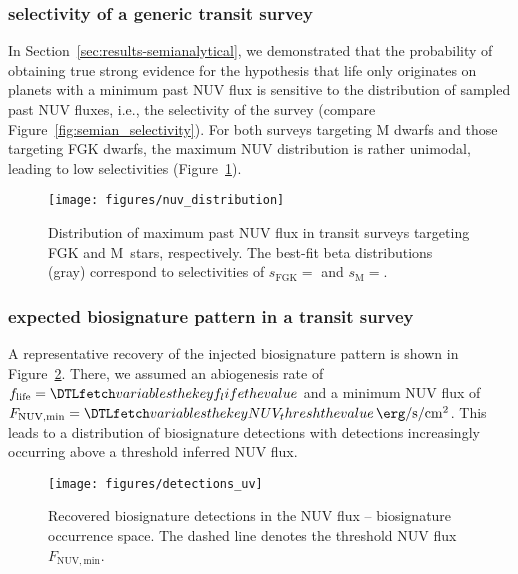 \documentclass[modern,linenumbers]{aastex631}
\begin{document}
\subsubsection{selectivity of a generic transit survey}
In Section~\ref{sec:results-semianalytical}, we demonstrated that the probability of obtaining true strong evidence for the hypothesis that life only originates on planets with a minimum past \gls{NUV} flux is sensitive to the distribution of sampled past \gls{NUV} fluxes, i.e., the selectivity of the survey (compare Figure~\ref{fig:semian_selectivity}).
For both surveys targeting M dwarfs and those targeting FGK dwarfs, the maximum \gls{NUV} distribution is rather unimodal, leading to low selectivities (Figure~\ref{fig:nuv_distribution}).
\begin{figure}
    \begin{centering}
        \texttt{[image: figures/nuv\_distribution]}
        \caption{Distribution of maximum past \gls{NUV} flux in transit surveys targeting FGK and M~stars, respectively. The best-fit beta distributions (gray) correspond to selectivities of $s_\mathrm{FGK} = $ and $s_\mathrm{M} = $.}
        \label{fig:nuv_distribution}
    \end{centering}
\end{figure}


\subsubsection{expected biosignature pattern in a transit survey}
A representative recovery of the injected biosignature pattern is shown in Figure~\ref{fig:detections_uv}.
There, we assumed an abiogenesis rate of $f_\mathrm{life} = \var{f_life}$ and a minimum \gls{NUV} flux of $F_\mathrm{NUV, min} = \var{NUV_thresh}\,\SI{}{\erg\per\second\per\centi\meter\squared}$.
This leads to a distribution of biosignature detections with detections increasingly occurring above a threshold inferred NUV flux.
\begin{figure}
    \begin{centering}
        \texttt{[image: figures/detections\_uv]}
        \caption{Recovered biosignature detections in the \gls{NUV} flux -- biosignature occurrence space. The dashed line denotes the threshold \gls{NUV} flux $F_\mathrm{NUV, min}$.}
        \label{fig:detections_uv}
    \end{centering}
\end{figure}
\end{document}

